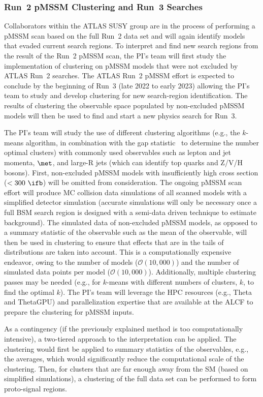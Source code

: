 \documentclass[letter, USenglish, 11pt, subfigure]{article}
\begin{document}
\subsubsection{Run~2 pMSSM Clustering and Run~3 Searches}

Collaborators within the ATLAS SUSY group are in the process of performing a pMSSM scan based on the full Run~2 data set and will again identify models that evaded current search regions. To interpret and find new search regions from the result of the Run~2 pMSSM scan, the PI's team will first study the implementation of clustering on pMSSM models that were not excluded by ATLAS Run~2 searches. The ATLAS Run~2 pMSSM effort is expected to conclude by the beginning of Run~3 (late 2022 to early 2023) allowing the PI's team to study and develop clustering for new search-region identification. The results of clustering the observable space populated by non-excluded pMSSM models will then be used to find and start a new physics search for Run~3.

The PI's team will study the use of different clustering algorithms (e.g., the $k$-means algorithm, in combination with the gap statistic~\cite{Tibishirani} to determine the number optimal clusters) with commonly used observables such as lepton and jet momenta, $\met$, and large-R jets (which can identify top quarks and Z/V/H bosons). First, non-excluded pMSSM models with insufficiently high cross section ($<300~\ifb$) will be omitted from consideration. The ongoing pMSSM scan effort will produce MC collision data simulations of all scanned models with a simplified detector simulation (accurate simulations will only be necessary once a full BSM search region is designed with a semi-data driven technique to estimate background). The simulated data of non-excluded pMSSM models, as opposed to a summary statistic of the observable such as the mean of the observable, will then be used in clustering to ensure that effects that are in the tails of distributions are taken into account. This is a computationally expensive endeavor, owing to the number of models ($\mathcal{O}(10,000)$) and the number of simulated data points per model ($\mathcal{O}(10,000)$). Additionally, multiple clustering passes may be needed (e.g., for $k$-means with different numbers of clusters, $k$, to find the optimal $k$). The PI's team will leverage the HPC resources (e.g., Theta and ThetaGPU) and parallelization expertise that are available at the ALCF to prepare the clustering for pMSSM inputs.

As a contingency (if the previously explained method is too computationally intensive), a two-tiered approach to the interpretation can be applied. The clustering would first be applied to summary statistics of the observables, e.g., the averages, which would significantly reduce the computational scale of the clustering. Then, for clusters that are far enough away from the SM (based on simplified simulations), a clustering of the full data set can be performed to form proto-signal regions. 
\end{document}
